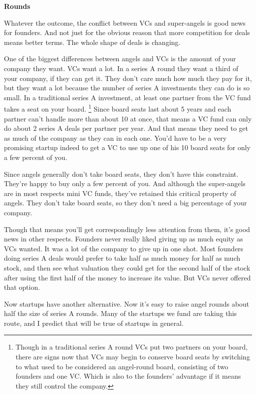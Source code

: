\textbf{Rounds}

Whatever the outcome, the conflict between VCs and super-angels is good
news for founders. And not just for the obvious reason that more
competition for deals means better terms. The whole shape of deals is
changing.

One of the biggest differences between angels and VCs is the amount of
your company they want. VCs want a lot. In a series A round they want a
third of your company, if they can get it. They don't care much how much
they pay for it, but they want a lot because the number of series A
investments they can do is so small. In a traditional series A
investment, at least one partner from the VC fund takes a seat on your
board. \footnote{Though in a traditional series A round VCs put two partners on
your board, there are signs now that VCs may begin to conserve board
seats by switching to what used to be considered an angel-round board,
consisting of two founders and one VC. Which is also to the founders'
advantage if it means they still control the company.} Since board seats last about 5 years and
each partner can't handle more than about 10 at once, that means a VC
fund can only do about 2 series A deals per partner per year. And that
means they need to get as much of the company as they can in each one.
You'd have to be a very promising startup indeed to get a VC to use up
one of his 10 board seats for only a few percent of you.

Since angels generally don't take board seats, they don't have this
constraint. They're happy to buy only a few percent of you. And although
the super-angels are in most respects mini VC funds, they've retained
this critical property of angels. They don't take board seats, so they
don't need a big percentage of your company.

Though that means you'll get correspondingly less attention from them,
it's good news in other respects. Founders never really liked giving up
as much equity as VCs wanted. It was a lot of the company to give up in
one shot. Most founders doing series A deals would prefer to take half
as much money for half as much stock, and then see what valuation they
could get for the second half of the stock after using the first half of
the money to increase its value. But VCs never offered that option.

Now startups have another alternative. Now it's easy to raise angel
rounds about half the size of series A rounds. Many of the startups we
fund are taking this route, and I predict that will be true of startups
in general.

